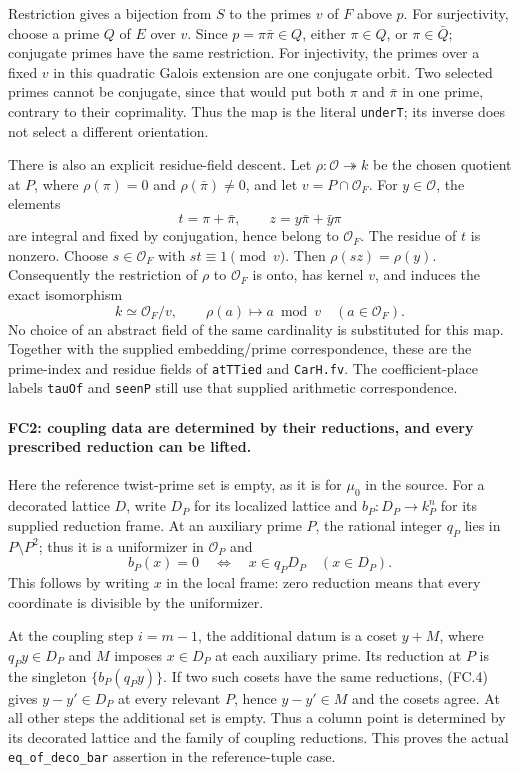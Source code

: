 Restriction gives a bijection from $S$ to the primes $v$ of $F$ above
$p$. For surjectivity, choose a prime $Q$ of $E$ over $v$. Since
$p=\pi\bar\pi\in Q$, either $\pi\in Q$, or
$\pi\in\bar Q$; conjugate primes have the same restriction. For
injectivity, the primes over a fixed $v$ in this quadratic Galois
extension are one conjugate orbit. Two selected primes cannot be
conjugate, since that would put both $\pi$ and $\bar\pi$ in one
prime, contrary to their coprimality. Thus the map is the literal
\texttt{underT}; its inverse does not select a different orientation.

There is also an explicit residue-field descent. Let
$\rho:\mathcal O\twoheadrightarrow k$ be the chosen quotient at $P$,
where $\rho(\pi)=0$ and $\rho(\bar\pi)\ne0$, and let
$v=P\cap\mathcal O_F$. For $y\in\mathcal O$, the elements
\[
 t=\pi+\bar\pi,\qquad z=y\bar\pi+\bar y\pi
 \tag{FC.2}
\]
are integral and fixed by conjugation, hence belong to $\mathcal O_F$.
The residue of $t$ is nonzero. Choose $s\in\mathcal O_F$ with
$st\equiv1\pmod v$. Then $\rho(sz)=\rho(y)$. Consequently the
restriction of $\rho$ to $\mathcal O_F$ is onto, has kernel $v$, and
induces the exact isomorphism
\[
 k\simeq\mathcal O_F/v,
 \qquad \rho(a)\longmapsto a\bmod v\quad(a\in\mathcal O_F).
 \tag{FC.3}
\]
No choice of an abstract field of the same cardinality is substituted
for this map. Together with the supplied embedding/prime correspondence,
these are the prime-index and residue fields of \texttt{atTTied} and
\texttt{CarH.fv}. The coefficient-place labels \texttt{tauOf} and
\texttt{seenP} still use that supplied arithmetic correspondence.

\paragraph{FC2: coupling data are determined by their reductions, and
every prescribed reduction can be lifted.}
Here the reference twist-prime set is empty, as it is for $\mu_0$ in
the source. For a decorated lattice $D$, write $D_P$ for its localized
lattice and $b_P:D_P\to k_P^n$ for its supplied reduction frame.
At an auxiliary prime $P$, the rational integer $q_P$ lies in
$P\setminus P^2$; thus it is a uniformizer in $\mathcal O_P$ and
\[
 b_P(x)=0\quad\Longleftrightarrow\quad x\in q_P D_P
 \quad(x\in D_P).                                      \tag{FC.4}
\]
This follows by writing $x$ in the local frame: zero reduction means
that every coordinate is divisible by the uniformizer.

At the coupling step $i=m-1$, the additional datum is a coset
$y+M$, where $q_Py\in D_P$ and $M$ imposes $x\in D_P$ at each
auxiliary prime. Its reduction at $P$ is the singleton
$\{b_P(q_Py)\}$. If two such cosets have the same reductions,
(FC.4) gives $y-y'\in D_P$ at every relevant $P$, hence
$y-y'\in M$ and the cosets agree. At all other steps the additional
set is empty. Thus a column point is determined by its decorated
lattice and the family of coupling reductions. This proves the actual
\texttt{eq\_of\_deco\_bar} assertion in the reference-tuple case.

